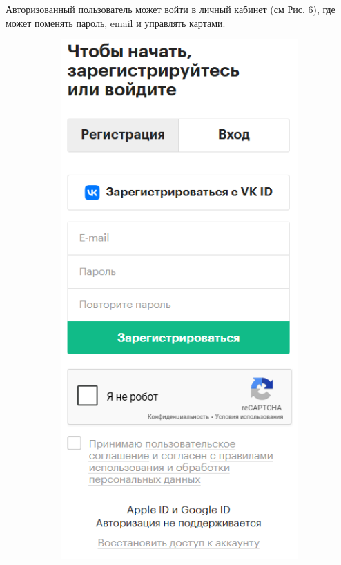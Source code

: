 \documentclass{scrreprt}
\begin{document}
 Авторизованный пользователь может войти в личный кабинет (см Рис. 6), где может поменять пароль, email и управлять картами.
  \begin{figure}[ht]
 	\centering
 	 \begin{subfigure}[b]{0.3\textwidth}
 		\includegraphics[width=\textwidth]{d}

\end{subfigure}
\end{figure}
\end{document}
